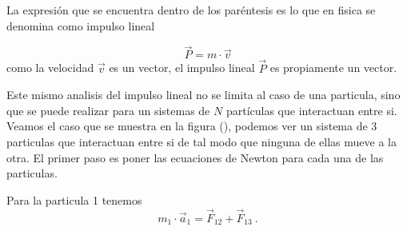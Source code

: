 \documentclass[../Main.tex]{subfiles}
\begin{document}
\begin{minipage}[t]{0.6\textwidth}
La expresión que se encuentra dentro de los paréntesis es lo que en fisica se 
denomina como impulso lineal

\begin{equation}
    \vec{P} = m \cdot \vec{v}
\label{eq:impLineal}
\end{equation}
como la velocidad $\vec{v}$ es un vector, el impulso lineal $\vec{P}$ es
propiamente un vector.

Este mismo analisis del impulso lineal no se limita al caso de una particula,
sino que se puede realizar para un sistemas de $N$ partículas que interactuan
entre si.
Veamos el caso que se muestra en la figura (), podemos ver un sistema de 3
particulas que interactuan entre si de tal modo que ninguna de ellas mueve a la 
otra. El primer paso es poner las ecuaciones de Newton para cada una de las
particulas.

Para la particula 1 tenemos
\begin{equation*}
    m_1 \cdot \vec{a} _1 = \vec{F} _{12} + \vec{F} _{13} \ .
\end{equation*}

\end{minipage}
\newpage
\begin{minipage}[t]{0.3\textwidth}
\end{minipage}
\hfill
\end{document}
